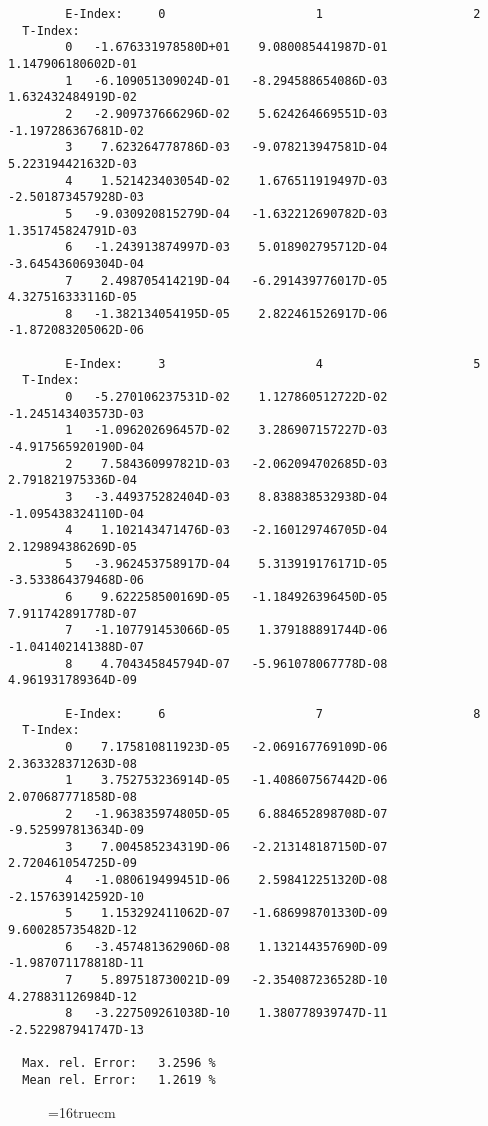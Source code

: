 \documentclass[12pt]{article}
\begin{document}
\begin{small}\begin{verbatim}
        E-Index:     0                     1                     2
  T-Index:
        0   -1.676331978580D+01    9.080085441987D-01    1.147906180602D-01
        1   -6.109051309024D-01   -8.294588654086D-03    1.632432484919D-02
        2   -2.909737666296D-02    5.624264669551D-03   -1.197286367681D-02
        3    7.623264778786D-03   -9.078213947581D-04    5.223194421632D-03
        4    1.521423403054D-02    1.676511919497D-03   -2.501873457928D-03
        5   -9.030920815279D-04   -1.632212690782D-03    1.351745824791D-03
        6   -1.243913874997D-03    5.018902795712D-04   -3.645436069304D-04
        7    2.498705414219D-04   -6.291439776017D-05    4.327516333116D-05
        8   -1.382134054195D-05    2.822461526917D-06   -1.872083205062D-06

        E-Index:     3                     4                     5
  T-Index:
        0   -5.270106237531D-02    1.127860512722D-02   -1.245143403573D-03
        1   -1.096202696457D-02    3.286907157227D-03   -4.917565920190D-04
        2    7.584360997821D-03   -2.062094702685D-03    2.791821975336D-04
        3   -3.449375282404D-03    8.838838532938D-04   -1.095438324110D-04
        4    1.102143471476D-03   -2.160129746705D-04    2.129894386269D-05
        5   -3.962453758917D-04    5.313919176171D-05   -3.533864379468D-06
        6    9.622258500169D-05   -1.184926396450D-05    7.911742891778D-07
        7   -1.107791453066D-05    1.379188891744D-06   -1.041402141388D-07
        8    4.704345845794D-07   -5.961078067778D-08    4.961931789364D-09

        E-Index:     6                     7                     8
  T-Index:
        0    7.175810811923D-05   -2.069167769109D-06    2.363328371263D-08
        1    3.752753236914D-05   -1.408607567442D-06    2.070687771858D-08
        2   -1.963835974805D-05    6.884652898708D-07   -9.525997813634D-09
        3    7.004585234319D-06   -2.213148187150D-07    2.720461054725D-09
        4   -1.080619499451D-06    2.598412251320D-08   -2.157639142592D-10
        5    1.153292411062D-07   -1.686998701330D-09    9.600285735482D-12
        6   -3.457481362906D-08    1.132144357690D-09   -1.987071178818D-11
        7    5.897518730021D-09   -2.354087236528D-10    4.278831126984D-12
        8   -3.227509261038D-10    1.380778939747D-11   -2.522987941747D-13

  Max. rel. Error:   3.2596 %
  Mean rel. Error:   1.2619 %

\end{verbatim}\end{small}
\begin{figure} \label{2.2.14c}
\epsfxsize=16truecm
\end{figure}
\newpage
\end{document}
